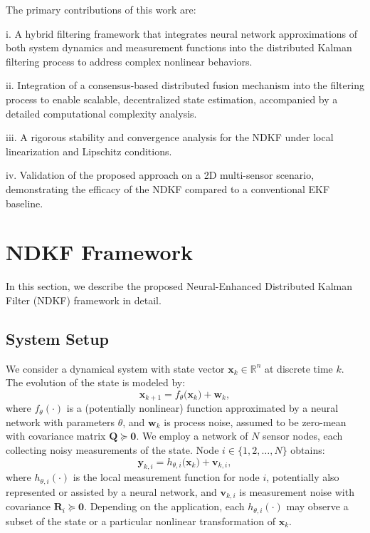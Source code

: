 \documentclass[letterpaper, 10 pt, conference]{ieeeconf}
\begin{document}
The primary contributions of this work are:
\begin{list}{}{\leftmargin=0em \itemindent=5pt}
    \item[i.] A hybrid filtering framework that integrates neural network approximations of both system dynamics and measurement functions into the distributed Kalman filtering process to address complex nonlinear behaviors.
    \item[ii.] Integration of a consensus-based distributed fusion mechanism into the filtering process to enable scalable, decentralized state estimation, accompanied by a detailed computational complexity analysis.
    \item[iii.] A rigorous stability and convergence analysis for the NDKF under local linearization and Lipschitz conditions.
    \item[iv.] Validation of the proposed approach on a 2D multi-sensor scenario, demonstrating the efficacy of the NDKF compared to a conventional EKF baseline.
\end{list}

\section{NDKF Framework}
\label{sec:methodology}

In this section, we describe the proposed Neural-Enhanced Distributed Kalman Filter (NDKF) framework in detail.

\subsection{System Setup}
\label{sec:system-setup}

We consider a dynamical system with state vector $\mathbf{x}_k\in\mathbb{R}^n$ at discrete time $k$. The evolution of the state is modeled by:
\begin{equation}
    \mathbf{x}_{k+1} = f_{\theta}\bigl(\mathbf{x}_k\bigr) + \mathbf{w}_k,
    \label{eq:system-dynamics}
\end{equation}
where $f_{\theta}(\cdot)$ is a (potentially nonlinear) function approximated by a neural network with parameters $\theta$, and $\mathbf{w}_k$ is process noise, assumed to be zero-mean with covariance matrix $\mathbf{Q} \succeq \mathbf{0}$. 
We employ a network of $N$ sensor nodes, each collecting noisy measurements of the state. Node $i \in \{1,2,\dots,N\}$ obtains:
\begin{equation}
    \mathbf{y}_{k,i} = h_{\theta,i}\bigl(\mathbf{x}_k\bigr) + \mathbf{v}_{k,i},
    \label{eq:measurement-model}
\end{equation}
where $h_{\theta,i}(\cdot)$ is the local measurement function for node $i$, potentially also represented or assisted by a neural network, and $\mathbf{v}_{k,i}$ is measurement noise with covariance $\mathbf{R}_i\succeq\mathbf{0}$. Depending on the application, each $h_{\theta,i}(\cdot)$ may observe a subset of the state or a particular nonlinear transformation of $\mathbf{x}_k$.
\end{document}
